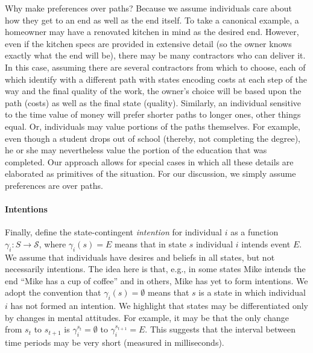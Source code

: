 \documentclass[
11pt,
titlepage,
reqno,
]{article}%
\theoremstyle{definition}
\begin{document}
	Why make preferences over paths? Because we assume individuals care about how they get to an end as well as the end itself. 
	To take a canonical example, a homeowner may have a renovated kitchen in mind as the desired end. 
	However, even if the kitchen specs are provided in extensive detail (so the owner knows exactly what the end will be), there may be many contractors who can deliver it. 
	In this case, assuming there are several contractors from which to choose, each of which identify with a different path with states encoding costs  at each step of the way and the final quality of the work, the owner's choice will be based upon the path (costs) as well as the final state (quality). 
	Similarly, an individual sensitive to the time value of money will prefer shorter paths to longer ones, other things equal. 
	Or, individuals may value portions of the paths themselves.
	For example, even though a student drops out of school (thereby, not completing the degree), he or she may nevertheless value the portion of the education that was completed. 
	Our approach allows for special cases in which all these details are elaborated as primitives of the situation. For our discussion, we simply assume preferences are over paths.    %
	

	\paragraph{Intentions \label{para: intentions}}
	
	Finally, define the state-contingent \textit{intention} for individual $i$ as a function $\gamma_i:S\rightarrow \mathcal{S}$, where $\gamma_i(s)=E$ means that in state $s$ individual $i$ intends event $E$. 
	We assume that individuals have desires and beliefs in all states, but not necessarily intentions. 
	The idea here is that, e.g., in some states Mike intends the end ``Mike has a cup of coffee'' and in others, Mike has yet to form intentions.
	We adopt the convention that $\gamma_i(s)=\emptyset$ means that $s$ is a state in which individual $i$ has not formed an intention. 
	We highlight that states may be differentiated only by changes in mental attitudes. 
	For example, it may be that the only change from $s_t$ to $s_{t+1}$ is $\gamma_i^{s_t}=\emptyset$ to $\gamma_i^{s_{t+1}}=E$.
	This suggests that the interval between time periods may be very short (measured in milliseconds).
	
\end{document}
